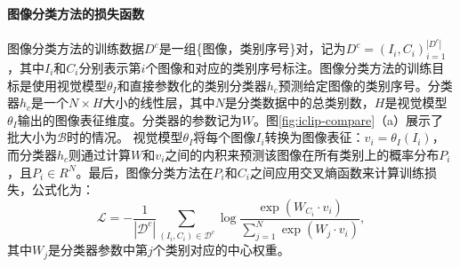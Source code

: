 \paragraph{图像分类方法的损失函数} 图像分类方法的训练数据$D^{c}$是一组\{图像，类别序号\}对，记为$D^{c}={(I_{i}, C_{i})}_{i=1}^{|D^{c}|}$，其中$I_{i}$和$C_{i}$分别表示第$i$个图像和对应的类别序号标注。图像分类方法的训练目标是使用视觉模型$\theta_{I}$和直接参数化的类别分类器$h_{c}$预测给定图像的类别序号。分类器$h_{c}$是一个$N×H$大小的线性层，其中$N$是分类数据中的总类别数，$H$是视觉模型$\theta_{I}$输出的图像表征维度。分类器的参数记为$W$。图\ref{fig:iclip-compare}（a）展示了批大小为$\mathcal{B}$时的情况。
视觉模型$\theta_{I}$将每个图像$I_{i}$转换为图像表征：$v_{i}=\theta_{I}(I_{i})$，而分类器$h_{c}$则通过计算$W$和$v_{i}$之间的内积来预测该图像在所有类别上的概率分布$P_{i}$，且$P_{i}\in R^{N}$。最后，图像分类方法在$P_{i}$和$C_{i}$之间应用交叉熵函数来计算训练损失，公式化为：
\begin{equation}
 \mathcal{L}=-\frac{1}{\left|\mathcal{D}^{c}\right|} \sum_{\left(I_{i}, C_{i}\right) \in \mathcal{D}^{c}} \log \frac{\exp \left(W_{C_{i}} \cdot v_{i}\right)}{\sum_{j=1}^{N} \exp \left(W_{j} \cdot v_{i}\right)},
 \label{eq:iclip-classification}
\end{equation}
其中$W_{j}$是分类器参数中第$j$个类别对应的中心权重。


